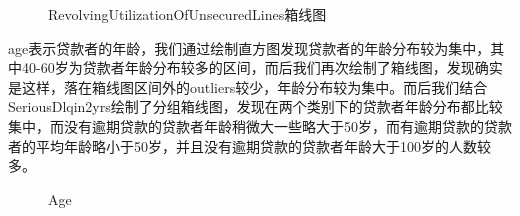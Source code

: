 \documentclass{zjureport}
\begin{document}
\begin{clause}
\begin{figure}[H]
    \caption{RevolvingUtilizationOfUnsecuredLines箱线图}
    \end{figure}
    \item age表示贷款者的年龄，我们通过绘制直方图发现贷款者的年龄分布较为集中，其中40-60岁为贷款者年龄分布较多的区间，而后我们再次绘制了箱线图，发现确实是这样，落在箱线图区间外的outliers较少，年龄分布较为集中。而后我们结合SeriousDlqin2yrs绘制了分组箱线图，发现在两个类别下的贷款者年龄分布都比较集中，而没有逾期贷款的贷款者年龄稍微大一些略大于50岁，而有逾期贷款的贷款者的平均年龄略小于50岁，并且没有逾期贷款的贷款者年龄大于100岁的人数较多。
    \begin{figure}[H]
    \centering  %
    \caption{Age}
    \label{Fig.main}
    \end{figure}
    

\end{clause}
\end{document}
